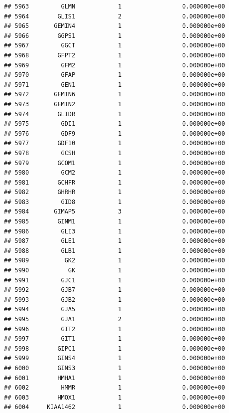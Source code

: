 \documentclass[
]{article}
\begin{document}
\begin{verbatim}
## 5963         GLMN            1                 0.000000e+00
## 5964        GLIS1            2                 0.000000e+00
## 5965       GEMIN4            1                 0.000000e+00
## 5966        GGPS1            1                 0.000000e+00
## 5967         GGCT            1                 0.000000e+00
## 5968        GFPT2            1                 0.000000e+00
## 5969         GFM2            1                 0.000000e+00
## 5970         GFAP            1                 0.000000e+00
## 5971         GEN1            1                 0.000000e+00
## 5972       GEMIN6            1                 0.000000e+00
## 5973       GEMIN2            1                 0.000000e+00
## 5974        GLIDR            1                 0.000000e+00
## 5975         GDI1            1                 0.000000e+00
## 5976         GDF9            1                 0.000000e+00
## 5977        GDF10            1                 0.000000e+00
## 5978         GCSH            1                 0.000000e+00
## 5979        GCOM1            1                 0.000000e+00
## 5980         GCM2            1                 0.000000e+00
## 5981        GCHFR            1                 0.000000e+00
## 5982        GHRHR            1                 0.000000e+00
## 5983         GID8            1                 0.000000e+00
## 5984       GIMAP5            3                 0.000000e+00
## 5985        GINM1            1                 0.000000e+00
## 5986         GLI3            1                 0.000000e+00
## 5987         GLE1            1                 0.000000e+00
## 5988         GLB1            1                 0.000000e+00
## 5989          GK2            1                 0.000000e+00
## 5990           GK            1                 0.000000e+00
## 5991         GJC1            1                 0.000000e+00
## 5992         GJB7            1                 0.000000e+00
## 5993         GJB2            1                 0.000000e+00
## 5994         GJA5            1                 0.000000e+00
## 5995         GJA1            2                 0.000000e+00
## 5996         GIT2            1                 0.000000e+00
## 5997         GIT1            1                 0.000000e+00
## 5998        GIPC1            1                 0.000000e+00
## 5999        GINS4            1                 0.000000e+00
## 6000        GINS3            1                 0.000000e+00
## 6001        HMHA1            1                 0.000000e+00
## 6002         HMMR            1                 0.000000e+00
## 6003        HMOX1            1                 0.000000e+00
## 6004     KIAA1462            1                 0.000000e+00

\end{verbatim}
\end{document}
